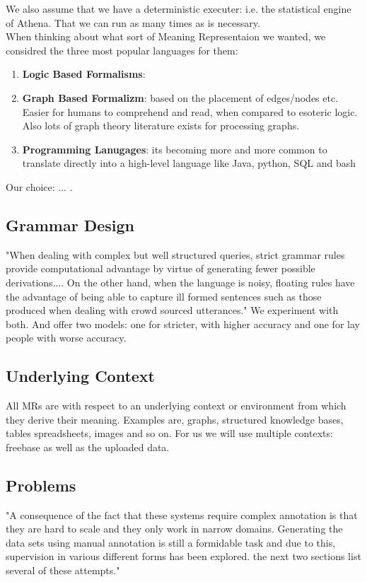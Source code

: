 \documentclass[pageno]{jpaper}
\begin{document}
We also assume that we have a deterministic executer: i.e. the statistical engine of Athena. That we can run as many times as is necessary.\\

When thinking about what sort of Meaning Representaion we wanted, we considred the three most popular languages for them:
\begin{enumerate}
\item \textbf{Logic Based Formalisms}: 
\item \textbf{Graph Based Formalizm}: based on the placement of edges/nodes etc. Easier for humans to comprehend and read, when compared to esoteric logic. Also lots of graph theory literature exists for processing graphs.
\item \textbf{Programming Lanugages}: its becoming more and more common to translate directly into a high-level language like Java, python, SQL and bash
\end{enumerate}
Our choice: ... .

\subsection{Grammar Design}
"When dealing with complex but well structured queries, strict grammar rules provide computational advantage by virtue of generating fewer possible derivations.... On the other hand, when the language is noisy, floating rules have the advantage of being able to capture ill formed sentences such as those produced when dealing with crowd sourced utterances." We experiment with both. And offer two models: one for stricter, with higher accuracy and one for lay people with worse accuracy.

\subsection{Underlying Context}
All MRs are with respect to an underlying context or environment from which they derive their meaning. Examples are, graphs, structured knowledge bases, tables spreadsheets, images and so on. For us we will use multiple contexts: freebase as well as the uploaded data.


\subsection{Problems}
"A consequence of the fact that these systems require complex annotation is that they are hard to scale and they only work in narrow domains. Generating the data sets using manual annotation is still a formidable task and due to this, supervision in various different forms has been explored. the next two sections list several of these attempts."
\end{document}
